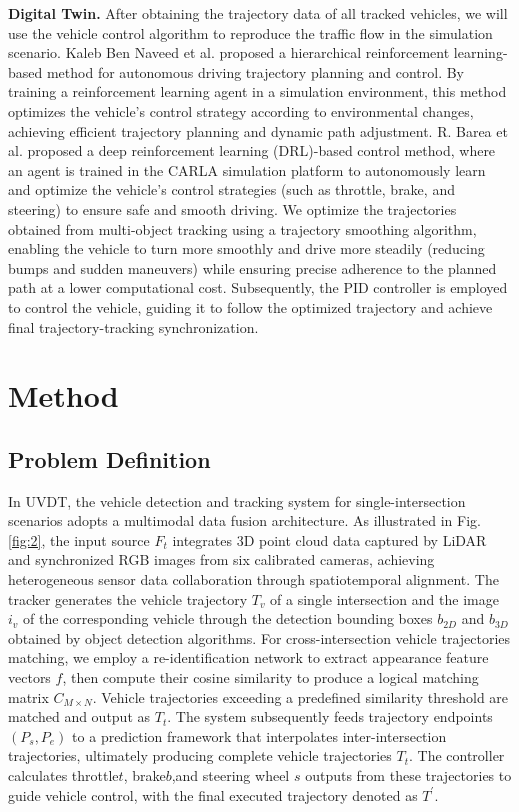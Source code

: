 \documentclass[lettersize,journal]{IEEEtran}
\begin{document}
\textbf{Digital Twin.}
After obtaining the trajectory data of all tracked vehicles, we will use the vehicle control algorithm to reproduce the traffic flow in the simulation scenario.
Kaleb Ben Naveed et al. proposed a hierarchical reinforcement learning-based method for autonomous driving trajectory planning and control. 
By training a reinforcement learning agent in a simulation environment, this method optimizes the vehicle's control strategy according to environmental changes, achieving efficient trajectory planning and dynamic path adjustment.\cite{Alpher22}
R. Barea et al. proposed a deep reinforcement learning (DRL)-based control method, where an agent is trained in the CARLA simulation platform to autonomously learn and optimize the vehicle's control strategies (such as throttle, brake, and steering) to ensure safe and smooth driving.\cite{Alpher21}
We optimize the trajectories obtained from multi-object tracking using a trajectory smoothing algorithm, enabling the vehicle to turn more smoothly and drive more steadily (reducing bumps and sudden maneuvers) while ensuring precise adherence to the planned path at a lower computational cost. 
Subsequently, the PID controller is employed to control the vehicle, guiding it to follow the optimized trajectory and achieve final trajectory-tracking synchronization.


\section{Method}

\subsection{Problem Definition}

In UVDT, the vehicle detection and tracking system for single-intersection scenarios adopts a multimodal data fusion architecture.
As illustrated in Fig. \ref{fig:2}, the input source \(F_{t}\) integrates 3D point cloud data captured by LiDAR and synchronized RGB images from six calibrated cameras, achieving heterogeneous sensor data collaboration through spatiotemporal alignment.
The tracker generates the vehicle trajectory \(T_{v}\) of a single intersection and the image \(i_{v}\) of the corresponding vehicle through the detection bounding boxes \(b_{2D}\) and \(b_{3D}\) obtained by object detection algorithms.
For cross-intersection vehicle trajectories matching, we employ a re-identification network to extract appearance feature vectors \(f\), then compute their cosine similarity to produce a logical matching matrix \(C_{M \times N}\).
Vehicle trajectories exceeding a predefined similarity threshold are matched and output as \(T_{t}\).
The system subsequently feeds trajectory endpoints \((P_{s},P_{e})\) to a prediction framework that interpolates inter-intersection trajectories, ultimately producing complete vehicle trajectories \(T_{t}\). 
The controller calculates throttle\(t\), brake\(b\),and steering wheel \(s\) outputs from these trajectories to guide vehicle control, with the final executed trajectory denoted as \(T^\prime\).
\end{document}
